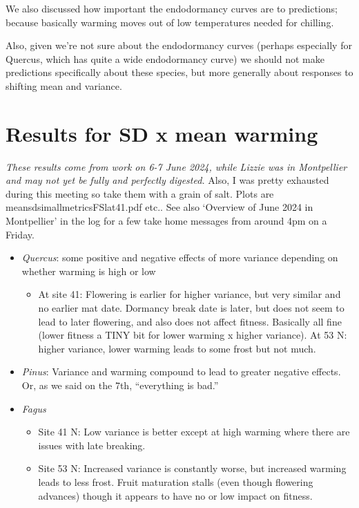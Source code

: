 \documentclass[11pt,letter]{article}
\begin{document}
We also discussed how important the endodormancy curves are to predictions; because basically warming moves out of low temperatures needed for chilling.

Also, given we're not sure about the endodormancy curves (perhaps especially for Quercus, which has quite a wide endodormancy curve) we should not make predictions specifically about these species, but more generally about responses to shifting mean and variance. 

\section{Results for SD x mean warming}
\emph{These results come from work on 6-7 June 2024, while Lizzie was in Montpellier and may not yet be fully and perfectly digested.} Also, I was pretty exhausted during this meeting so take them with a grain of salt. Plots are meansdsimallmetricsFSlat41.pdf etc.. See also `Overview of June 2024 in Montpellier' in the log for a few take home messages from around 4pm on a Friday. 

\begin{itemize}
\item \emph{Quercus}: some positive and negative effects of more variance depending on whether warming is high or low
\begin{itemize}
\item At site 41: Flowering is earlier for higher variance, but very similar and no earlier mat date. Dormancy break date is later, but does not seem to lead to later flowering, and also does not affect fitness. Basically all fine (lower fitness a TINY bit for lower warming x higher variance).  At 53 N: higher variance, lower warming leads to some frost but not much.
\end{itemize}
\item \emph{Pinus}: Variance and warming compound to lead to greater negative effects. Or, as we said on the 7th, ``everything is bad.''
\item \emph{Fagus}
\begin{itemize}
\item Site 41 N: Low variance is better except at high warming where there are issues with late breaking.
\item Site 53 N: Increased variance is constantly worse, but increased warming leads to less frost. Fruit maturation stalls (even though flowering advances) though it appears to have no or low impact on fitness. 
\end{itemize}
\end{itemize}
\end{document}
